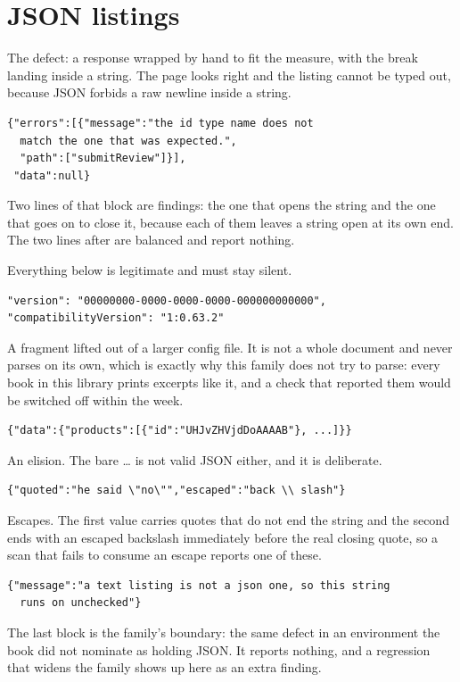 \section{JSON listings}
\label{sec:ch01-json}

The defect: a response wrapped by hand to fit the measure, with the break
landing inside a string. The page looks right and the listing cannot be typed
out, because JSON forbids a raw newline inside a string.

\begin{verbatim}
{"errors":[{"message":"the id type name does not
  match the one that was expected.",
  "path":["submitReview"]}],
 "data":null}
\end{verbatim}

Two lines of that block are findings: the one that opens the string and the
one that goes on to close it, because each of them leaves a string open at its
own end. The two lines after are balanced and report nothing.

Everything below is legitimate and must stay silent.

\begin{verbatim}
"version": "00000000-0000-0000-0000-000000000000",
"compatibilityVersion": "1:0.63.2"
\end{verbatim}

A fragment lifted out of a larger config file. It is not a whole document and
never parses on its own, which is exactly why this family does not try to
parse: every book in this library prints excerpts like it, and a check that
reported them would be switched off within the week.

\begin{verbatim}
{"data":{"products":[{"id":"UHJvZHVjdDoAAAAB"}, ...]}}
\end{verbatim}

An elision. The bare \ldots{} is not valid JSON either, and it is deliberate.

\begin{verbatim}
{"quoted":"he said \"no\"","escaped":"back \\ slash"}
\end{verbatim}

Escapes. The first value carries quotes that do not end the string and the
second ends with an escaped backslash immediately before the real closing
quote, so a scan that fails to consume an escape reports one of these.

\begin{verbatim}
{"message":"a text listing is not a json one, so this string
  runs on unchecked"}
\end{verbatim}

The last block is the family's boundary: the same defect in an environment the
book did not nominate as holding JSON. It reports nothing, and a regression
that widens the family shows up here as an extra finding.
